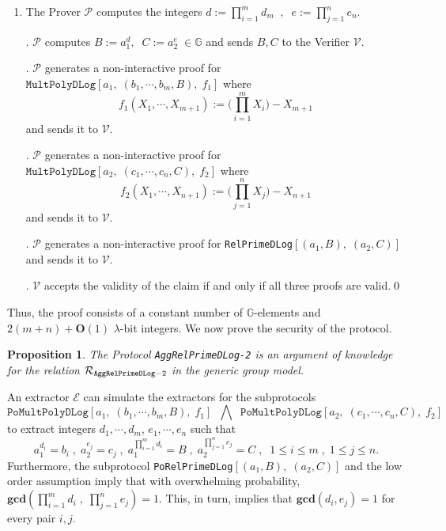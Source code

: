 \documentclass[11pt, lettersize, notitlepage, leqno, footskip=0.6cm]{article}
\newcommand{\pl}{\prod\limits}
\newcommand{\ttt}{\texttt}
\newcommand{\mc}{\mathcal}
\newcommand{\mb}{\mathbb}
\newcommand{\mbf}{\mathbf}
\newcommand{\lam}{\lambda}
\newcommand{\bO}{\mbf{O}}
\newcommand{\vs}{\vspace{-0.15cm}}
\newcommand{\noin}{\noindent}
\newcommand{\op}{overwhelming probability}
\newcommand{\GCD}{\mbf{gcd}}
\newcommand{\E}{\mc{E}}
\newtheorem{Prop}[Thm]{Proposition}
\numberwithin{equation}{section}
\begin{document}
\begin{enumerate}[wide, labelwidth=!, labelindent=0pt]\vs \item The Prover $\mc{P}$ computes the integers ${d}:= \prod_{i=1}^m d_m\;\;,\;\; {e}:= \prod_{j=1}^n e_n.$ 

. $\mc{P}$ computes $B:= a_1^{d},\;\;C:= a_2^{e}\;\in\mb{G}$ and sends $B, C$ to the Verifier $\mc{V}$.

. $\mc{P}$ generates a non-interactive proof for $\ttt{MultPolyDLog}[a_1,\;(b_1,\cdots,b_m, B),\; f_1]$ where \vs $$f_1(X_1,\cdots, X_{m+1}):= \big(\pl_{i=1}^m X_i\big) -X_{m+1}$$ and sends it to $\mc{V}$.

\noin 4. $\mc{P}$ generates a non-interactive proof for $ \ttt{MultPolyDLog}[a_2,\;(c_1,\cdots,c_n, C),\; f_2]$ where \vs $$f_2(X_1,\cdots, X_{n+1}):= \big(\pl_{j=1}^n X_j\big) -X_{n+1}$$ and sends it to $\mc{V}$.

. $\mc{P}$ generates a non-interactive proof for \verb|RelPrimeDLog|$[(a_1, B),\;(a_2, C)]$ and sends it to $\mc{V}$. 

. $\mc{V}$ accepts the validity of the claim if and only if all three proofs are valid.\qed \end{enumerate}

\noin Thus, the proof consists of a constant number of $\mb{G}$-elements and $2(m+n)+\bO(1)$ $\lam$-bit integers. We now prove the security of the protocol.\vspace{0.2cm}


\begin{Prop} The Protocol \verb|AggRelPrimeDLog-2| is an argument of knowledge for the relation $\mc{R}_{\tt{AggRelPrimeDLog-2}}$ in the generic group
model.\end{Prop}

\begin{prf} An extractor $\E$ can simulate the extractors for the subprotocols \vs $$\ttt{PoMultPolyDLog}[a_1,\;(b_1,\cdots,b_m, B),\; f_1]\;\;\bigwedge\;\;\ttt{PoMultPolyDLog}[a_2,\;(c_1,\cdots,c_n, C),\; f_2] $$ to extract integers $d_1,\cdots,d_m$, $e_1,\cdots,e_n$ such that \vs $$a_1^{d_i} = b_i\;,\;a_2^{e_j} = c_j \;,\; a_1^{\pl_{i=1}^m d_i} = B\;,\;a_2^{\pl_{j=1}^n e_j} = C \;,\;\;1\leq i\leq m\;,\;1\leq j\leq n.$$ Furthermore, the subprotocol \verb|PoRelPrimeDLog|$[(a_1, B),\;(a_2, C)]$ and the low order assumption imply that with \op, $\GCD(\prod_{i=1}^m d_i\;,\; \prod_{j=1}^n e_j) = 1$. This, in turn, implies that $\GCD(d_i,e_j) = 1$ for every pair $i,j$.\end{prf}
\end{document}
